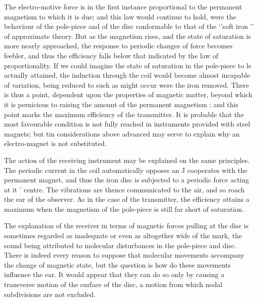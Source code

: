The electro-motive force is in the first instance proportional
to the permanent magnetism to which it is due; and this law
would continue to hold, were the behaviour of the pole-piece and
of the disc conformable to that of the ‘'soft iron ’’ of approximate
theory. But as the magnetism rises, and the state of saturation
is more nearly approached, the response to periodic changes of
force becomes feebler, and thus the efficiency falls below that
indicated by the law of proportionality. If we could imagine the
state of saturation in the pole-piece to le actually attained, the
induction through the coil would become almost incapable of
variation, being reduced to such as might occur were the iron
removed. There is thus a point, dependent upon the properties
of magnetic matter, beyond which it is pernicious to raising the
amount of the permanent magnetism ; and this point marks the
maximum efficiency of the transmitter. It is probable that the
most favourable condition is not fully reached in instruments
provided with steel magnets; but tin considerations above
advanced may serve to explain why an electro-magnet is not substituted.

The action of the receiving instrument may be explained on
the same principles. The periodic current in the coil automatically
opposes an J cooperates with the permanent magnet, and thus the
iron disc is subjected to a periodic force acting at it ' centre.
The vibrations are thence communicated to the air, and so roach
the ear of the observer. As in the case of the transmitter, the
efficiency attains a maximum when the magnetism of the pole-piece is still far
short of saturation.

The explanation of the receiver in terms of magnetic forces
pulling at the disc is sometimes regarded as inadequate or even as
altogether wide of the mark, the sound being attributed to molecular
disturbances in the pole-piece and disc. There is indeed
every reason to suppose that molecular movements accompany
the change of magnetic state, but the question is how do these
movements influence the ear. It would appear that they can do
so only by causing a transverse motion of the surface of the disc,
a motion from which nodal subdivisions are not excluded.

